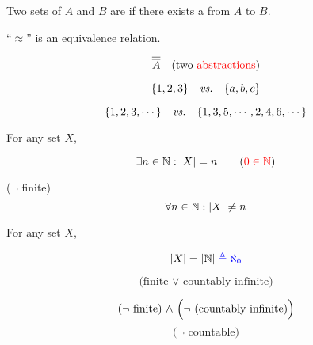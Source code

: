 \begin{frame}{}
\end{frame}

\begin{frame}{}
  \begin{definition}[$|A| = |B| \;(A \approx B)$ (1878)]
    Two sets of $A$ and $B$ are  if there exists a  from $A$ to $B$.
  \end{definition}

  \pause
  \vspace{0.60cm}
  \centerline{``$\approx$'' is an equivalence relation.}

  \pause
  \[
    \overline{\overline{A}} \quad \text{(two \textcolor{red}{abstractions})}
  \]

  \pause
  \[
    \{1,2,3\} \quad \text{\it vs.} \quad \{a,b,c\}
  \]

  \pause
  \[
    \{1,2,3,\cdots\} \quad \text{\it vs.} \quad \{1,3,5,\cdots, 2,4,6,\cdots\}
  \]
\end{frame}

\begin{frame}{}
  \begin{definition}
    For any set $X$,
    \begin{description}[Infinite]
      \item[Finite] 
	\[
	  \exists n \in \mathbb{N}: |X| = n  \qquad (\textcolor{red}{0 \in \mathbb{N}})
	\]
      \item[Infinite] ($\lnot$ finite)
	\[
	  \forall n \in \mathbb{N}: |X| \neq n
	\]
    \end{description}
  \end{definition}

\end{frame}

\begin{frame}{}
  \begin{definition}
    For any set $X$,
    \begin{description}
      \item[Countably Infinite]
	\[
	  |X| = |\mathbb{N}| \textcolor{blue}{\;\triangleq \aleph_{0}}
	\]
      \item[Countable]
	\[
	  \text{(finite $\lor$ countably infinite)}
	\]
      \item[Uncountably Infinite] 
	\[
	  \text{($\lnot$ finite) $\land$ \Big($\lnot$ (countably infinite)\Big)}
	\]
	\[
	  \text{($\lnot$ countable)}
	\]
    \end{description}
  \end{definition}
\end{frame}

